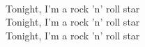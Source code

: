 \\
Tonight, I'm a rock 'n' roll star \\
Tonight, I'm a rock 'n' roll star \\
Tonight, I'm a rock 'n' roll star \\
